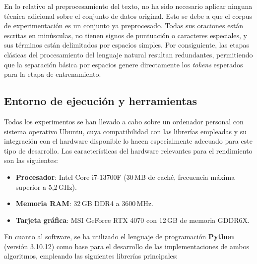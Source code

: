 En lo relativo al preprocesamiento del texto, no ha sido necesario aplicar ninguna técnica adicional sobre el conjunto de datos original. Esto se debe a que el corpus de experimentación es un conjunto ya preprocesado. Todas sus oraciones están escritas en minúsculas, no tienen signos de puntuación o caracteres especiales, y sus términos están delimitados por espacios simples. Por consiguiente, las etapas clásicas del procesamiento del lenguaje natural resultan redundantes, permitiendo que la separación básica por espacios genere directamente los \textit{tokens} esperados para la etapa de entrenamiento.

\subsection{Entorno de ejecución y herramientas}

Todos los experimentos se han llevado a cabo sobre un ordenador personal con sistema operativo Ubuntu, cuya compatibilidad con las librerías empleadas y su integración con el hardware disponible lo hacen especialmente adecuado para este tipo de desarrollo. Las características del hardware relevantes para el rendimiento son las siguientes:

\begin{itemize}
  \item \textbf{Procesador}: Intel Core i7-13700F (30\,MB de caché, frecuencia máxima superior a 5,2\,GHz).
  \item \textbf{Memoria RAM}: 32\,GB DDR4 a 3600\,MHz.
  \item \textbf{Tarjeta gráfica}: MSI GeForce RTX 4070 con 12\,GB de memoria GDDR6X.
\end{itemize}

En cuanto al software, se ha utilizado el lenguaje de programación \textbf{Python} (versión 3.10.12) como base para el desarrollo de las implementaciones de ambos algoritmos, empleando las siguientes librerías principales:

